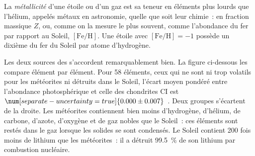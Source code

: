 \begin{definition}[Métallicité]\label{def:b3:origin-of-elements:metallicity}
La \emph{métallicité} d'une étoile ou d'un gaz est sa
teneur en éléments plus lourds que l'hélium, appelés métaux en astronomie,
quelle que soit leur chimie~: en fraction massique $Z$, ou, comme on la
mesure le plus souvent, comme l'abondance du fer par rapport au Soleil, $[\mathrm{Fe/H}]$.
Une étoile avec $[\mathrm{Fe/H}] = -1$ possède un dixième du fer du Soleil par
atome d'hydrogène.
\end{definition}

Les deux sources des  s'accordent remarquablement bien. La
figure ci-dessous les compare élément par élément. Pour 58 éléments, ceux
qui ne sont ni trop volatils pour les météorites ni détruits dans le Soleil,
l'écart moyen pondéré entre l'abondance photosphérique et celle des chondrites
CI est $\num[separate-uncertainty=true]{0.000 \pm 0.007}$~. Deux groupes
s'écartent de la droite. Les météorites contiennent bien moins d'hydrogène, d'hélium,
de carbone, d'azote, d'oxygène et de gaz nobles que le Soleil~: ces éléments
sont restés dans le gaz lorsque les solides se sont condensés. Le Soleil contient
\num{200} fois moins de lithium que les météorites~: il a détruit
\qty{99.5}{\percent} de son lithium par combustion nucléaire.

